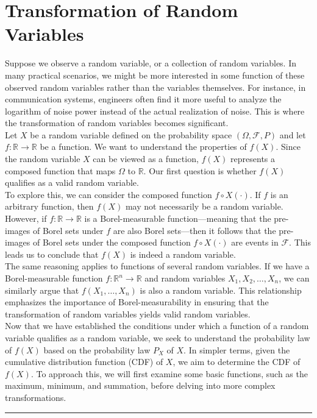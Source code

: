 \chapter{Transformation of Random Variables}

Suppose we observe a random variable, or a collection of random variables. In many practical scenarios, we might be more interested in some function of these observed random variables rather than the variables themselves. For instance, in communication systems, engineers often find it more useful to analyze the logarithm of noise power instead of the actual realization of noise. This is where the transformation of random variables becomes significant.\\

Let \(X\) be a random variable defined on the probability space \((\Omega, \mathcal{F}, P)\) and let \(f : \mathbb{R} \to \mathbb{R}\) be a function. We want to understand the properties of \(f(X)\). Since the random variable \(X\) can be viewed as a function, \(f(X)\) represents a composed function that maps \(\Omega\) to \(\mathbb{R}\). Our first question is whether \(f(X)\) qualifies as a valid random variable.\\

To explore this, we can consider the composed function \(f \circ X(\cdot)\). If \(f\) is an arbitrary function, then \(f(X)\) may not necessarily be a random variable. However, if \(f : \mathbb{R} \to \mathbb{R}\) is a Borel-measurable function—meaning that the pre-images of Borel sets under \(f\) are also Borel sets—then it follows that the pre-images of Borel sets under the composed function \(f \circ X(\cdot)\) are events in \(\mathcal{F}\). This leads us to conclude that \(f(X)\) is indeed a random variable. \\

The same reasoning applies to functions of several random variables. If we have a Borel-measurable function \(f : \mathbb{R}^n \to \mathbb{R}\) and random variables \(X_1, X_2, \ldots, X_n\), we can similarly argue that \(f(X_1, \ldots, X_n)\) is also a random variable. This relationship emphasizes the importance of Borel-measurability in ensuring that the transformation of random variables yields valid random variables.\\

Now that we have established the conditions under which a function of a random variable qualifies as a random variable, we seek to understand the probability law of \( f(X) \) based on the probability law \( P_X \) of \( X \). In simpler terms, given the cumulative distribution function (CDF) of \( X \), we aim to determine the CDF of \( f(X) \). To approach this, we will first examine some basic functions, such as the maximum, minimum, and summation, before delving into more complex transformations.





\vspace{30pt}
\hrule